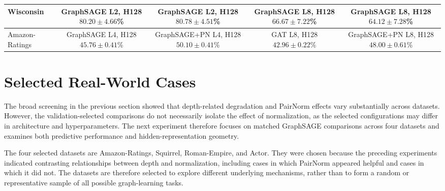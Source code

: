 \documentclass[english]{lni}
\begin{document}
\begin{landscape}
\begin{table}[p]
\begin{tabular*}{\linewidth}{@{\extracolsep{\fill}}lcccc@{}}
Wisconsin &
\makecell{GraphSAGE\\L2, H128\\$80.20\pm4.66$\%} &
\makecell{GraphSAGE\\L2, H128\\$80.78\pm4.51$\%} &
\makecell{GraphSAGE\\L8, H128\\$66.67\pm7.22$\%} &
\makecell{GraphSAGE\\L8, H128\\$64.12\pm7.28$\%}\\
\midrule

Amazon-Ratings &
\makecell{GraphSAGE\\L4, H128\\$45.76\pm0.41$\%} &
\makecell{GraphSAGE+PN\\L4, H128\\$50.10\pm0.41$\%} &
\makecell{GAT\\L8, H128\\$42.96\pm0.22$\%} &
\makecell{GraphSAGE+PN\\L8, H128\\$48.00\pm0.61$\%}\\

\bottomrule
\end{tabular*}
\end{table}
\end{landscape}

\section{Selected Real-World Cases}
\label{sec:selected-realworld}

The broad screening in the previous section showed that depth-related degradation and PairNorm effects vary substantially across datasets. However, the validation-selected comparisons do not necessarily isolate the effect of normalization, as the selected configurations may differ in architecture and hyperparameters. The next experiment therefore focuses on matched GraphSAGE comparisons across four datasets and examines both predictive performance and hidden-representation geometry.

The four selected datasets are Amazon-Ratings, Squirrel, Roman-Empire, and Actor. They were chosen because the preceding experiments indicated contrasting relationships between depth and normalization, including cases in which PairNorm appeared helpful and cases in which it did not. The datasets are therefore selected to explore different underlying mechanisms, rather than to form a random or representative sample of all possible graph-learning tasks.
\end{document}
